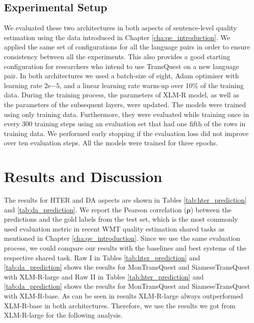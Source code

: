 \subsection{Experimental Setup}
\label{sec:transquest_experiment}
We evaluated these two architectures in both aspects of sentence-level quality estimation using the data introduced in Chapter \ref{cha:qe_introduction}. We applied the same set of configurations for all the language pairs in order to ensure consistency between all the experiments. This also provides a good starting configuration for researchers who intend to use TransQuest on a new language pair. In both architectures we used a batch-size of eight, Adam optimiser with learning rate $2\mathrm{e}{-5}$, and a linear learning rate warm-up over 10\% of the training data. During the training process, the parameters of XLM-R model, as well as the parameters of the subsequent layers, were updated. The models were trained using only training data. Furthermore, they were evaluated while training once in every 300 training steps using an evaluation set that had one fifth of the rows in training data. We performed early stopping if the evaluation loss did not improve over ten evaluation steps. All the models were trained for three epochs.

\section{Results and Discussion}
\label{sec:transquest_results}
The results for HTER and DA aspects are shown in Tables \ref{tab:hter_prediction} and \ref{tab:da_prediction}. We report the Pearson correlation ($\bm{\rho}$) between the predictions and the gold labels from the test set, which is the most commonly used evaluation metric in recent WMT quality estimation shared tasks \cite{specia-etal-2018-findings,fonseca-etal-2019-findings,specia-etal-2020-findings-wmt} as mentioned in Chapter \ref{cha:qe_introduction}. Since we use the same evaluation process, we could compare our results with the baselines and best systems of the respective shared task. Raw I in Tables \ref{tab:hter_prediction} and \ref{tab:da_prediction} shows the results for MonTransQuest and SiameseTransQuest with XLM-R-large and Raw II in Tables \ref{tab:hter_prediction} and \ref{tab:da_prediction} shows the results for MonTransQuest and SiameseTransQuest with XLM-R-base. As can be seen in results XLM-R-large always outperformed XLM-R-base in both architectures. Therefore, we use the results we got from XLM-R-large for the following analysis.

